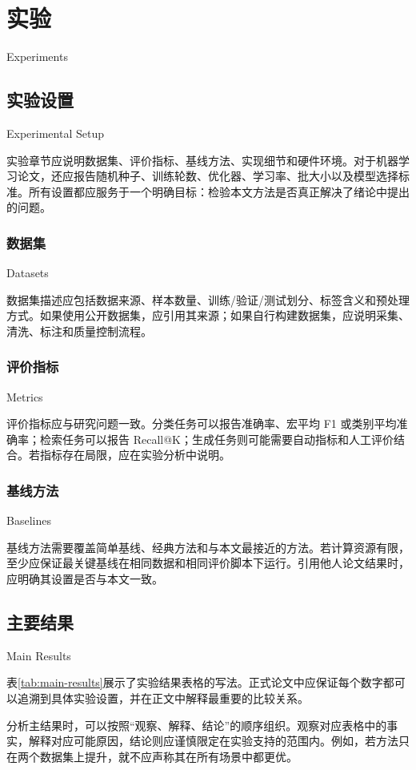 \chapter{实验}{Experiments}

\section{实验设置}{Experimental Setup}

实验章节应说明数据集、评价指标、基线方法、实现细节和硬件环境。对于机器学习论文，还应报告随机种子、训练轮数、优化器、学习率、批大小以及模型选择标准。所有设置都应服务于一个明确目标：检验本文方法是否真正解决了绪论中提出的问题。

\subsection{数据集}{Datasets}

数据集描述应包括数据来源、样本数量、训练/验证/测试划分、标签含义和预处理方式。如果使用公开数据集，应引用其来源；如果自行构建数据集，应说明采集、清洗、标注和质量控制流程。

\subsection{评价指标}{Metrics}

评价指标应与研究问题一致。分类任务可以报告准确率、宏平均 F1 或类别平均准确率；检索任务可以报告 Recall@K；生成任务则可能需要自动指标和人工评价结合。若指标存在局限，应在实验分析中说明。

\subsection{基线方法}{Baselines}

基线方法需要覆盖简单基线、经典方法和与本文最接近的方法。若计算资源有限，至少应保证最关键基线在相同数据和相同评价脚本下运行。引用他人论文结果时，应明确其设置是否与本文一致。

\section{主要结果}{Main Results}

表\ref{tab:main-results}展示了实验结果表格的写法。正式论文中应保证每个数字都可以追溯到具体实验设置，并在正文中解释最重要的比较关系。



分析主结果时，可以按照“观察、解释、结论”的顺序组织。观察对应表格中的事实，解释对应可能原因，结论则应谨慎限定在实验支持的范围内。例如，若方法只在两个数据集上提升，就不应声称其在所有场景中都更优。

